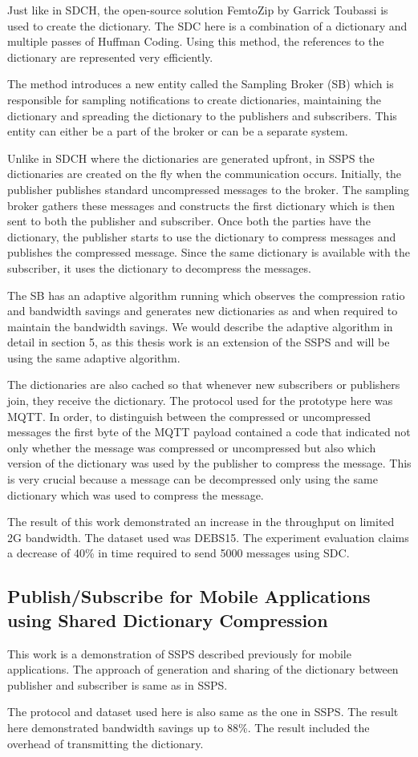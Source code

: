 Just like in SDCH, the open-source solution FemtoZip by Garrick Toubassi is used to create the dictionary. The SDC here is a combination of a dictionary and multiple passes of Huffman Coding. Using this method, the references to the dictionary are represented very efficiently.

The method introduces a new entity called the Sampling Broker (SB) which is responsible for sampling notifications to create dictionaries, maintaining the dictionary and spreading the dictionary to the publishers and subscribers. This entity can either be a part of the broker or can be a separate system. 

Unlike in SDCH where the dictionaries are generated upfront, in SSPS the dictionaries are created on the fly when the communication occurs. Initially, the publisher publishes standard uncompressed messages to the broker. The sampling broker gathers these messages and constructs the first dictionary which is then sent to both the publisher and subscriber. Once both the parties have the dictionary, the publisher starts to use the dictionary to compress messages and publishes the compressed message. Since the same dictionary is available with the subscriber, it uses the dictionary to decompress the messages.

The SB has an adaptive algorithm running which observes the compression ratio and bandwidth savings and generates new dictionaries as and when required to maintain the bandwidth savings. We would describe the adaptive algorithm in detail in section 5, as this thesis work is an extension of the SSPS and will be using the same adaptive algorithm. 

The dictionaries are also cached so that whenever new subscribers or publishers join, they receive the dictionary. The protocol used for the prototype here was MQTT. In order, to distinguish between the compressed or uncompressed messages the first byte of the MQTT payload contained a code that indicated not only whether the message was compressed or uncompressed but also which version of the dictionary was used by the publisher to compress the message. This is very crucial because a message can be decompressed only using the same dictionary which was used to compress the message. 

The result of this work demonstrated an increase in the throughput on limited 2G bandwidth. The dataset used was DEBS15. The experiment evaluation claims a decrease of 40\% in time required to send 5000 messages using SDC.


\subsection{Publish/Subscribe for Mobile Applications using Shared Dictionary Compression}

This work is a demonstration of SSPS described previously for mobile applications. The approach of generation and sharing of the dictionary between publisher and subscriber is same as in SSPS.

The protocol and dataset used here is also same as the one in SSPS. The result here demonstrated bandwidth savings up to 88\%. The result included the overhead of transmitting the dictionary.